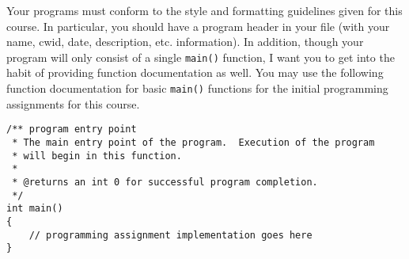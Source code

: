 \documentclass[11pt]{article}
\begin{document}
Your programs must conform to the style and formatting guidelines
given for this course.  In particular, you should have a program
header in your file (with your name, cwid, date, description,
etc. information).  In addition, though your program will only consist
of a single \verb~main()~ function, I want you to get into the habit of
providing function documentation as well.  You may use the following
function documentation for basic \verb~main()~ functions for the initial
programming assignments for this course.


\begin{verbatim}
/** program entry point
 * The main entry point of the program.  Execution of the program
 * will begin in this function.
 *
 * @returns an int 0 for successful program completion.
 */
int main()
{
    // programming assignment implementation goes here
}
\end{verbatim}
\end{document}
